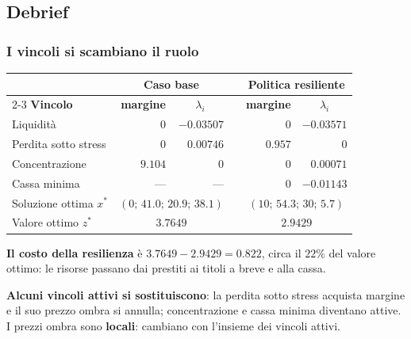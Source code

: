 

\subsection{Debrief}%

\begin{frame}%
%

\frametitle{I vincoli si scambiano il ruolo}%
%

%


\begin{center}
{\small
\begin{tabular}
[c]{lrcrrc}\hline
& \multicolumn{2}{c}{\textbf{Caso base}} &  &
\multicolumn{2}{c}{\textbf{Politica resiliente}}\\\cline{2-3}\cline{5-6}%
\textbf{Vincolo} & \textbf{margine} & $\lambda_{i}$ &  & \textbf{margine} &
$\lambda_{i}$\\\hline
Liquidit\`{a} & $0$ & \multicolumn{1}{r}{$-0.03507$} &  & $0$ &
\multicolumn{1}{r}{$-0.03571$}\\
Perdita sotto stress & $0$ & \multicolumn{1}{r}{$0.00746$} &  & $0.957$ &
\multicolumn{1}{r}{$0$}\\
Concentrazione & $9.104$ & \multicolumn{1}{r}{$0$} &  & $0$ &
\multicolumn{1}{r}{$0.00071$}\\
Cassa minima & --- & \multicolumn{1}{r}{---} &  & $0$ &
\multicolumn{1}{r}{$-0.01143$}\\\hline
Soluzione ottima $x^{\ast}$ & \multicolumn{2}{c}{$(0;\,41.0;\,20.9;\,38.1)$} &
& \multicolumn{2}{c}{$(10;\,54.3;\,30;\,5.7)$}\\
Valore ottimo $z^{\ast}$ & \multicolumn{2}{c}{$3.7649$} &  &
\multicolumn{2}{c}{$2.9429$}\\\hline
\end{tabular}
}
\end{center}

\begin{stepitemize}
\item \textbf{Il costo della resilienza} \`{e} $3.7649-2.9429=0.822$, circa il
$22\%$ del valore ottimo: le risorse passano dai prestiti ai titoli a breve e
alla cassa.

\item \textbf{Alcuni vincoli attivi si sostituiscono}: la perdita sotto stress
acquista margine e il suo prezzo ombra si annulla; concentrazione e cassa
minima diventano attive. I prezzi ombra sono \textbf{locali}: cambiano con
l'insieme dei vincoli attivi.
\end{stepitemize}

%

\transboxout
\end{frame}%


